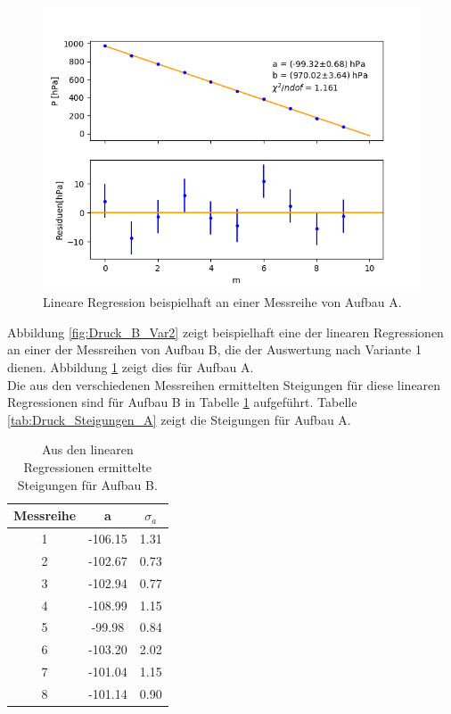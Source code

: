 \documentclass[12pt,a4paper]{article}
\begin{document}
\begin{figure}
\centering
\includegraphics[scale=0.8]{Bilder/Druck_A_Var2_1.png}
\caption{Lineare Regression beispielhaft an einer Messreihe von Aufbau A.}
\label{fig:Druck_A_Var2}
\end{figure}

Abbildung \ref{fig:Druck_B_Var2} zeigt beispielhaft eine der linearen Regressionen an einer der Messreihen von Aufbau B, die der Auswertung nach Variante 1 dienen. Abbildung \ref{fig:Druck_A_Var2} zeigt dies für Aufbau A. \\
Die aus den verschiedenen Messreihen ermittelten Steigungen für diese linearen Regressionen sind für Aufbau B in Tabelle \ref{tab:Druck_Steigungen_B} aufgeführt. Tabelle \ref{tab:Druck_Steigungen_A} zeigt die Steigungen für Aufbau A.

\begin{table}
\begin{center}
\begin{tabular}{|c|c|c|}
\hline 
Messreihe & a & $\sigma _a$ \\ 
\hline 
1 & -106.15 & 1.31 \\ 
\hline 
2 & -102.67 & 0.73 \\ 
\hline 
3 & -102.94 & 0.77 \\ 
\hline 
4 & -108.99 & 1.15 \\ 
\hline 
5 & -99.98 & 0.84 \\ 
\hline 
6 & -103.20 & 2.02 \\ 
\hline 
7 & -101.04 & 1.15 \\ 
\hline 
8 & -101.14 & 0.90 \\ 
\hline 
\end{tabular} 
\caption{Aus den linearen Regressionen ermittelte Steigungen für Aufbau B.}
\label{tab:Druck_Steigungen_B}
\end{center}
\end{table}
\end{document}
